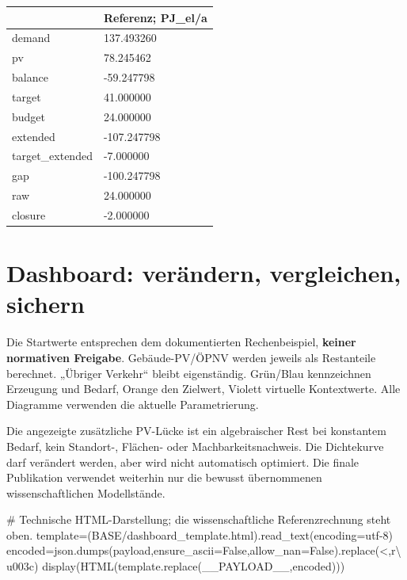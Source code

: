 \documentclass[
  ngerman,
  a4paper,
  DIV=11]{scrreprt}
\newenvironment{Shaded}{\begin{snugshade}}{\end{snugshade}}
\newcommand{\CharTok}[1]{\textcolor[rgb]{0.13,0.47,0.30}{#1}}
\newcommand{\CommentTok}[1]{\textcolor[rgb]{0.37,0.37,0.37}{#1}}
\newcommand{\NormalTok}[1]{\textcolor[rgb]{0.00,0.23,0.31}{#1}}
\newcommand{\OperatorTok}[1]{\textcolor[rgb]{0.37,0.37,0.37}{#1}}
\newcommand{\StringTok}[1]{\textcolor[rgb]{0.13,0.47,0.30}{#1}}
\newcommand{\VariableTok}[1]{\textcolor[rgb]{0.07,0.07,0.07}{#1}}
\newcommand{\VerbatimStringTok}[1]{\textcolor[rgb]{0.13,0.47,0.30}{#1}}
\newcounter{none} %
\begin{document}
{\def\LTcaptype{none} %
\begin{longtable}[]{@{}ll@{}}
\toprule\noalign{}
& Referenz; PJ\_el/a \\
\midrule\noalign{}
\endhead
\bottomrule\noalign{}
\endlastfoot
demand & 137.493260 \\
pv & 78.245462 \\
balance & -59.247798 \\
target & 41.000000 \\
budget & 24.000000 \\
extended & -107.247798 \\
target\_extended & -7.000000 \\
gap & -100.247798 \\
raw & 24.000000 \\
closure & -2.000000 \\
\end{longtable}
}

\section{Dashboard: verändern, vergleichen,
sichern}\label{dashboard-veruxe4ndern-vergleichen-sichern}

Die Startwerte entsprechen dem dokumentierten Rechenbeispiel,
\textbf{keiner normativen Freigabe}. Gebäude-PV/ÖPNV werden jeweils als
Restanteile berechnet. „Übriger Verkehr`` bleibt eigenständig. Grün/Blau
kennzeichnen Erzeugung und Bedarf, Orange den Zielwert, Violett
virtuelle Kontextwerte. Alle Diagramme verwenden die aktuelle
Parametrierung.

Die angezeigte zusätzliche PV-Lücke ist ein algebraischer Rest bei
konstantem Bedarf, kein Standort-, Flächen- oder Machbarkeitsnachweis.
Die Dichtekurve darf verändert werden, aber wird nicht automatisch
optimiert. Die finale Publikation verwendet weiterhin nur die bewusst
übernommenen wissenschaftlichen Modellstände.

\begin{Shaded}
\begin{Highlighting}[]
\CommentTok{\# Technische HTML{-}Darstellung; die wissenschaftliche Referenzrechnung steht oben.}
\NormalTok{template}\OperatorTok{=}\NormalTok{(BASE}\OperatorTok{/}\StringTok{\textquotesingle{}dashboard\_template.html\textquotesingle{}}\NormalTok{).read\_text(encoding}\OperatorTok{=}\StringTok{\textquotesingle{}utf{-}8\textquotesingle{}}\NormalTok{)}
\NormalTok{encoded}\OperatorTok{=}\NormalTok{json.dumps(payload,ensure\_ascii}\OperatorTok{=}\VariableTok{False}\NormalTok{,allow\_nan}\OperatorTok{=}\VariableTok{False}\NormalTok{).replace(}\StringTok{\textquotesingle{}\textless{}\textquotesingle{}}\NormalTok{,}\VerbatimStringTok{r\textquotesingle{}}\CharTok{\textbackslash{}u003c}\VerbatimStringTok{\textquotesingle{}}\NormalTok{)}
\NormalTok{display(HTML(template.replace(}\StringTok{\textquotesingle{}\_\_PAYLOAD\_\_\textquotesingle{}}\NormalTok{,encoded)))}
\end{Highlighting}
\end{Shaded}
\end{document}
